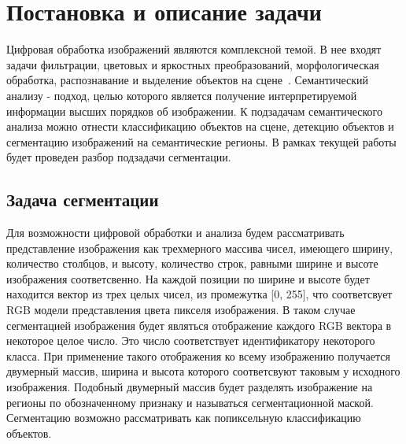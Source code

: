 
\section{Постановка и описание задачи}

Цифровая обработка изображений являются комплексной темой.
В нее входят задачи фильтрации, цветовых и яркостных
преобразований, морфологическая обработка, распознавание и выделение объектов на сцене~\autocite{gonzalez2008digital}.
Семантический анализу - подход, целью которого является получение интерпретируемой информации высших порядков об изображении.
К подзадачам семантического анализа можно отнести классификацию объектов на сцене, детекцию объектов и сегментацию изображений на семантические регионы.
В рамках текущей работы будет проведен разбор подзадачи сегментации.

\subsection{Задача сегментации}

Для возможности цифровой обработки и анализа будем рассматривать представление изображения как трехмерного массива чисел,
имеющего ширину, количество столбцов, и высоту, количество строк, равными ширине и высоте изображения соответсвенно.
На каждой позиции по ширине и высоте будет находится вектор из трех целых чисел, из промежутка [0, 255], что
соответсвует RGB модели представления цвета пикселя изображения.
В таком случае сегментацией изображения будет являться отображение каждого RGB вектора в некоторое целое число.
Это число соответствует идентификатору некоторого класса.
При применение такого отображения ко всему изображению получается двумерный массив, ширина и высота которого
соответсвуют таковым у исходного изображения.
Подобный двумерный массив будет разделять изображение на регионы по обозначенному признаку и называться сегментационной маской.
Сегментацию возможно рассматривать как попиксельную классификацию объектов.

